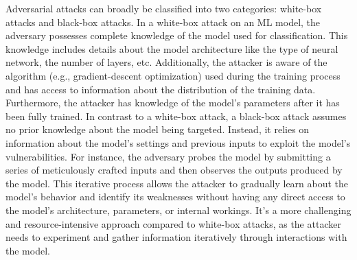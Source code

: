 \documentclass[sn-mathphys]{sn-jnl}%
\theoremstyle{thmstyleone}%
\theoremstyle{thmstyletwo}%
\theoremstyle{thmstylethree}%
\begin{document}
Adversarial attacks can broadly be classified into two categories: white-box attacks and black-box attacks. In a white-box attack on an ML model, the adversary possesses complete knowledge of the model used for classification. This knowledge includes details about the model architecture like the type of neural network, the number of layers, etc. Additionally, the attacker is aware of the algorithm (e.g., gradient-descent optimization) used during the training process and has access to information about the distribution of the training data. Furthermore, the attacker has knowledge of the model's parameters after it has been fully trained. In contrast to a white-box attack, a black-box attack assumes no prior knowledge about the model being targeted. Instead, it relies on information about the model's settings and previous inputs to exploit the model's vulnerabilities. For instance, the adversary probes the model by submitting a series of meticulously crafted inputs and then observes the outputs produced by the model. This iterative process allows the attacker to gradually learn about the model's behavior and identify its weaknesses without having any direct access to the model's architecture, parameters, or internal workings. It's a more challenging and resource-intensive approach compared to white-box attacks, as the attacker needs to experiment and gather information iteratively through interactions with the model.
\end{document}
